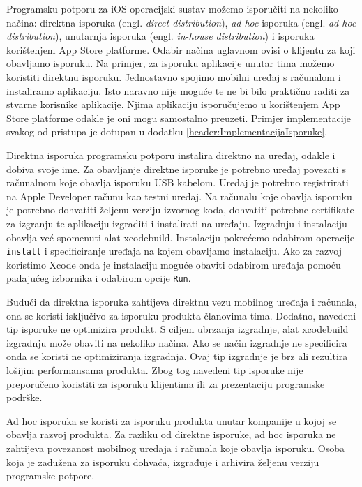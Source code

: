 \documentclass[times, utf8, diplomski, numeric]{fer}
\newcommand{\eng}[1]{(engl. \textit{#1})}
\begin{document}
Programsku potporu za iOS operacijski sustav možemo isporučiti na nekoliko načina: direktna isporuka \eng{direct distribution}, \textit{ad hoc} isporuka \eng{ad hoc distribution}, unutarnja isporuka \eng{in-house distribution} i isporuka korištenjem App Store platforme. Odabir načina uglavnom ovisi o klijentu za koji obavljamo isporuku. Na primjer, za isporuku aplikacije unutar tima možemo koristiti direktnu isporuku. Jednostavno spojimo mobilni uređaj s računalom i instaliramo aplikaciju. Isto naravno nije moguće te ne bi bilo praktično raditi za stvarne korisnike aplikacije. Njima aplikaciju isporučujemo u korištenjem App Store platforme odakle je oni mogu samostalno preuzeti. Primjer implementacije svakog od pristupa je dotupan u dodatku \ref{header:ImplementacijaIsporuke}.

Direktna isporuka programsku potporu instalira direktno na uređaj, odakle i dobiva svoje ime. Za obavljanje direktne isporuke je potrebno uređaj povezati s računalnom koje obavlja isporuku USB kabelom. Uređaj je potrebno registrirati na Apple Developer računu kao testni uređaj. Na računalu koje obavlja isporuku je potrebno dohvatiti željenu verziju izvornog koda, dohvatiti potrebne certifikate za izgranju te aplikaciju izgraditi i instalirati na uređaju. Izgradnju i instalaciju obavlja već spomenuti alat xcodebuild. Instalaciju pokrećemo odabirom operacije \verb|install| i specificiranje uređaja na kojem obavljamo instalaciju. Ako za razvoj koristimo Xcode onda je instalaciju moguće obaviti odabirom uređaja pomoću padajućeg izbornika i odabirom opcije \verb|Run|.

Budući da direktna isporuka zahtijeva direktnu vezu mobilnog uređaja i računala, ona se koristi isključivo za isporuku produkta članovima tima. Dodatno, navedeni tip isporuke ne optimizira produkt. S ciljem ubrzanja izgradnje, alat xcodebuild izgradnju može obaviti na nekoliko načina. Ako se način izgradnje ne specificira onda se koristi ne optimiziranja izgradnja. Ovaj tip izgradnje je brz ali rezultira lošijim performansama produkta. Zbog tog navedeni tip isporuke nije preporučeno koristiti za isporuku klijentima ili za prezentaciju programske podrške.

Ad hoc isporuka se koristi za isporuku produkta unutar kompanije u kojoj se obavlja razvoj produkta. Za razliku od direktne isporuke, ad hoc isporuka ne zahtijeva povezanost mobilnog uređaja i računala koje obavlja isporuku. Osoba koja je zadužena za isporuku dohvaća, izgrađuje i arhivira željenu verziju programske potpore.
\end{document}
